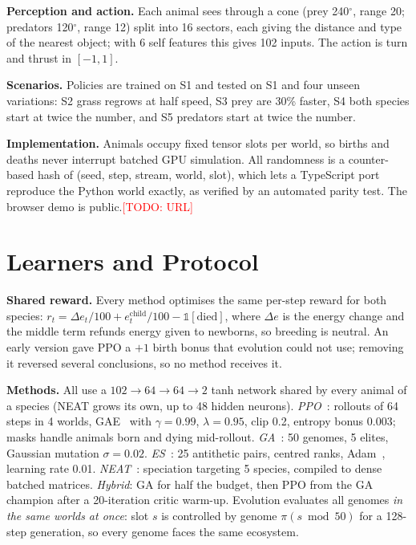 \documentclass[conference]{IEEEtran}
\newcommand{\todo}[1]{\textcolor{red}{[TODO: #1]}}
\begin{document}
\textbf{Perception and action.} Each animal sees through a cone (prey 240$^\circ$, range 20; predators 120$^\circ$, range 12) split into 16 sectors, each giving the distance and type of the nearest object; with 6 self features this gives 102 inputs. The action is turn and thrust in $[-1,1]$.

\textbf{Scenarios.} Policies are trained on S1 and tested on S1 and four unseen variations: S2 grass regrows at half speed, S3 prey are 30\% faster, S4 both species start at twice the number, and S5 predators start at twice the number.

\textbf{Implementation.} Animals occupy fixed tensor slots per world, so births and deaths never interrupt batched GPU simulation. All randomness is a counter-based hash of (seed, step, stream, world, slot), which lets a TypeScript port reproduce the Python world exactly, as verified by an automated parity test. The browser demo is public.\todo{URL}

\section{Learners and Protocol}

\textbf{Shared reward.} Every method optimises the same per-step reward for both species: $r_t = \Delta e_t/100 + e^{\text{child}}_t/100 - \mathbb{1}[\text{died}]$, where $\Delta e$ is the energy change and the middle term refunds energy given to newborns, so breeding is neutral. An early version gave PPO a $+1$ birth bonus that evolution could not use; removing it reversed several conclusions, so no method receives it.

\textbf{Methods.} All use a $102\to64\to64\to2$ tanh network shared by every animal of a species (NEAT grows its own, up to 48 hidden neurons).
\emph{PPO}~\cite{schulman2017ppo}: rollouts of 64 steps in 4 worlds, GAE~\cite{schulman2016gae} with $\gamma=0.99$, $\lambda=0.95$, clip 0.2, entropy bonus 0.003; masks handle animals born and dying mid-rollout.
\emph{GA}~\cite{such2017}: 50 genomes, 5 elites, Gaussian mutation $\sigma=0.02$.
\emph{ES}~\cite{salimans2017}: 25 antithetic pairs, centred ranks, Adam~\cite{kingma2015}, learning rate 0.01.
\emph{NEAT}~\cite{stanley2002}: speciation targeting 5 species, compiled to dense batched matrices.
\emph{Hybrid}: GA for half the budget, then PPO from the GA champion after a 20-iteration critic warm-up.
Evolution evaluates all genomes \emph{in the same worlds at once}: slot $s$ is controlled by genome $\pi(s \bmod 50)$ for a 128-step generation, so every genome faces the same ecosystem.
\end{document}
